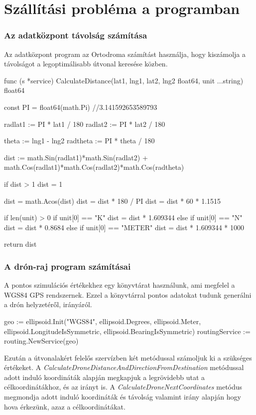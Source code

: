 \section{Szállítási probléma a programban}
\subsubsection{Az adatközpont távolság számítása}
Az adatközpont program az Ortodroma számítást használja, hogy kiszámolja a távolságot a legoptimálisabb útvonal keresése közben.
\begin{python}
    func (s *service) CalculateDistance(lat1, lng1, lat2,
    lng2 float64, unit ...string) float64 {
        const PI = float64(math.Pi) //3.141592653589793

        radlat1 := PI * lat1 / 180
        radlat2 := PI * lat2 / 180

        theta := lng1 - lng2
        radtheta := PI * theta / 180

        dist := math.Sin(radlat1)*math.Sin(radlat2) +
        math.Cos(radlat1)*math.Cos(radlat2)*math.Cos(radtheta)

        if dist > 1 {
            dist = 1
        }

        dist = math.Acos(dist)
        dist = dist * 180 / PI
        dist = dist * 60 * 1.1515

        if len(unit) > 0 {
            if unit[0] == "K" {
                dist = dist * 1.609344
            } else if unit[0] == "N" {
                dist = dist * 0.8684
            } else if unit[0] == "METER" {
                dist = dist * 1.609344 * 1000
            }
        }

        return dist
    }
\end{python}
\subsubsection{A drón-raj program számításai}
A pontos szimulációs értékekhez egy könyvtárat használunk, ami megfelel a WGS84 GPS rendszernek.
Ezzel a könyvtárral pontos adatokat tudunk generálni a drón helyzetéről, irányáról.

\begin{python}
    geo := ellipsoid.Init("WGS84", ellipsoid.Degrees, ellipsoid.Meter,
    ellipsoid.LongitudeIsSymmetric, ellipsoid.BearingIsSymmetric)
    routingService := routing.NewService(geo)
\end{python}

Ezután a útvonalakért felelős szervízben két metódussal számoljuk ki a szükséges értékeket.
A \textit{CalculateDroneDistanceAndDirectionFromDestination} metódussal adott induló koordináták alapján megkapjuk a legrövidebb utat a célkoordinátákhoz, és az irányt is.
A \textit{CalculateDroneNextCoordinates} metódus megmondja adott induló koordináták és távolság valamint irány alapján hogy hova érkezünk, azaz a célkoordinátákat.


